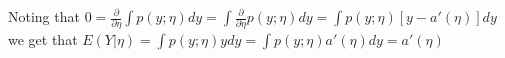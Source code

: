 %
%
\begin{answer}
Noting that $0 = \frac{\partial}{\partial \eta} \int p(y;\eta) dy = \int \frac{\partial}{\partial \eta} p(y;\eta)dy = \int p(y;\eta) [y - a'(\eta)] dy$ we get that $E(Y|\eta) = \int p(y;\eta)y dy = \int p(y;\eta) a'(\eta)dy = a'(\eta)$
\end{answer}
%